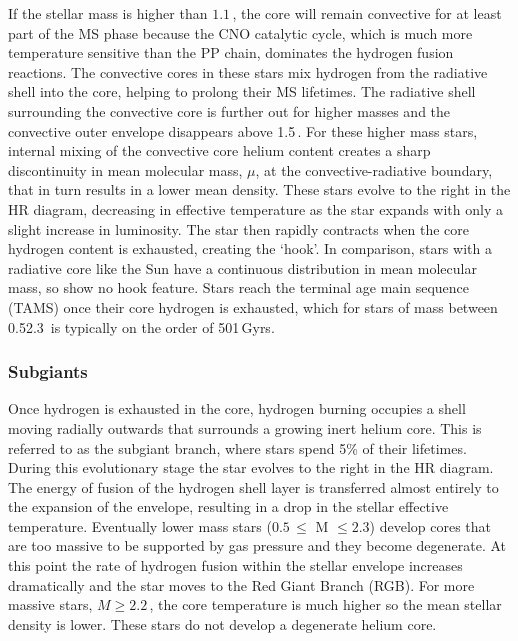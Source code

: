 If the stellar mass is higher than $1.1\,$\Msol, the core will remain convective for at least part of the MS phase because the CNO catalytic cycle, which is much more temperature sensitive than the PP chain, dominates the hydrogen fusion reactions. The convective cores in these stars mix hydrogen from the radiative shell into the core, helping to prolong their MS lifetimes. The radiative shell surrounding the convective core is further out for higher masses and the convective outer envelope disappears above 1.5\,\Msol{}. 
For these higher mass stars, internal mixing of the convective core helium content creates a sharp discontinuity in mean molecular mass, $\mu$, at the convective-radiative boundary, that in turn results in a lower mean density. These stars evolve to the right in the HR diagram, decreasing in effective temperature as the star expands with only a slight increase in luminosity. The star then rapidly contracts when the core hydrogen content is exhausted, creating the `hook'. In comparison, stars with a radiative core like the Sun have a continuous distribution in mean molecular mass, so show no hook feature. Stars reach the terminal age main sequence (TAMS) once their core hydrogen is exhausted, which for stars of mass between 0.5\textendash{}2.3\,\Msol{} is typically on the order of 50\textendash{}1\,Gyrs.

\subsubsection{Subgiants}

Once hydrogen is exhausted in the core, hydrogen burning occupies a shell moving radially outwards that surrounds a growing inert helium core. This is referred to as the subgiant branch, where stars spend \texttildelow{}5\% of their lifetimes. During this evolutionary stage the star evolves to the right in the HR diagram. The energy of fusion of the hydrogen shell layer is transferred almost entirely to the expansion of the envelope, resulting in a drop in the stellar effective temperature. Eventually lower mass stars ($0.5$\,\Msol{}$ \leq $ M $ \leq 2.3$\Msol{}) develop cores that are too massive to be supported by gas pressure and they become degenerate. At this point the rate of hydrogen fusion within the stellar envelope increases dramatically and the star moves to the Red Giant Branch (RGB). For more massive stars, $M \geq 2.2$\,\Msol{}, the core temperature is much higher so the mean stellar density is lower. These stars do not develop a degenerate helium core.

